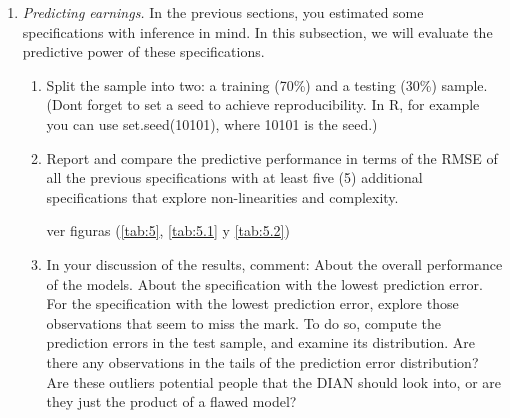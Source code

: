 \documentclass[12pt,a4paper,onecolumn]{article}
\begin{document}
\begin{enumerate}
\begin{enumerate}
    
    

    \end{enumerate}
    
    \item \textit{Predicting earnings.} In the previous sections, you estimated some specifications with inference in mind. In this subsection, we will evaluate the predictive power of these specifications.

\begin{enumerate}
    \item Split the sample into two: a training (70\%) and a testing (30\%) sample. (Dont forget to set a seed to achieve reproducibility. In R, for example you can use set.seed(10101), where 10101 is the seed.)
    \item Report and compare the predictive performance in terms of the RMSE of all the previous specifications with at least five (5) additional specifications that explore non-linearities and complexity.

   ver figuras (\ref{tab:5}, \ref{tab:5.1} y \ref{tab:5.2})



    
    \item In your discussion of the results, comment:
    About the overall performance of the models.
    About the specification with the lowest prediction error.
    For the specification with the lowest prediction error, explore those observations that seem to miss the mark. To do so, compute the prediction errors in the test sample, and examine its distribution. Are there any observations in the tails of the prediction error distribution? Are these outliers potential people that the DIAN should look into, or are they just the product of a flawed model?



\end{enumerate}
\end{enumerate}
\end{document}

